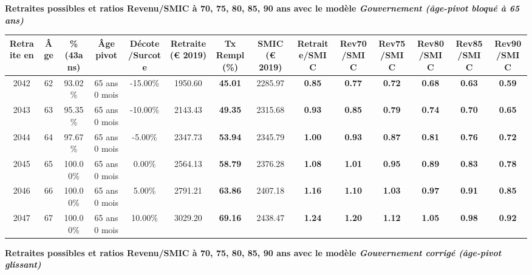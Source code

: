 {\bf \noindent Retraites possibles et ratios Revenu/SMIC à 70, 75, 80, 85, 90 ans avec le modèle \emph{Gouvernement (âge-pivot bloqué à 65 ans)}}  
 
\begin{adjustbox}{max width=\textwidth} 
\begin{tabular}[htb]{|c|c||c|c|c||c|c||c||c|c|c|c|c|c|} 
\hline 
 Retraite en &  Âge &  \%(43ans) &  Âge pivot &  Décote/Surcote &  Retraite (\euro{} 2019) &  Tx Rempl(\%) &  SMIC (\euro{} 2019) &  Retraite/SMIC &  Rev70/SMIC &  Rev75/SMIC &  Rev80/SMIC &  Rev85/SMIC &  Rev90/SMIC \\ 
\hline \hline 
 2042 &  62 &  93.02\% &  65 ans 0 mois &  -15.00\% &  1950.60 &  {\bf 45.01} &  2285.97 &  {\bf {\color{red} 0.85}} &  {\bf {\color{red} 0.77}} &  {\bf {\color{red} 0.72}} &  {\bf {\color{red} 0.68}} &  {\bf {\color{red} 0.63}} &  {\bf {\color{red} 0.59}} \\ 
\hline 
 2043 &  63 &  95.35\% &  65 ans 0 mois &  -10.00\% &  2143.43 &  {\bf 49.35} &  2315.68 &  {\bf {\color{red} 0.93}} &  {\bf {\color{red} 0.85}} &  {\bf {\color{red} 0.79}} &  {\bf {\color{red} 0.74}} &  {\bf {\color{red} 0.70}} &  {\bf {\color{red} 0.65}} \\ 
\hline 
 2044 &  64 &  97.67\% &  65 ans 0 mois &  -5.00\% &  2347.73 &  {\bf 53.94} &  2345.79 &  {\bf 1.00} &  {\bf {\color{red} 0.93}} &  {\bf {\color{red} 0.87}} &  {\bf {\color{red} 0.81}} &  {\bf {\color{red} 0.76}} &  {\bf {\color{red} 0.72}} \\ 
\hline 
 2045 &  65 &  100.00\% &  65 ans 0 mois &  0.00\% &  2564.13 &  {\bf 58.79} &  2376.28 &  {\bf 1.08} &  {\bf 1.01} &  {\bf {\color{red} 0.95}} &  {\bf {\color{red} 0.89}} &  {\bf {\color{red} 0.83}} &  {\bf {\color{red} 0.78}} \\ 
\hline 
 2046 &  66 &  100.00\% &  65 ans 0 mois &  5.00\% &  2791.21 &  {\bf 63.86} &  2407.18 &  {\bf 1.16} &  {\bf 1.10} &  {\bf 1.03} &  {\bf {\color{red} 0.97}} &  {\bf {\color{red} 0.91}} &  {\bf {\color{red} 0.85}} \\ 
\hline 
 2047 &  67 &  100.00\% &  65 ans 0 mois &  10.00\% &  3029.20 &  {\bf 69.16} &  2438.47 &  {\bf 1.24} &  {\bf 1.20} &  {\bf 1.12} &  {\bf 1.05} &  {\bf {\color{red} 0.98}} &  {\bf {\color{red} 0.92}} \\ 
\hline 
\hline 
\end{tabular} 
\end{adjustbox} 
 
 \vspace{0.1cm} 
{\bf \noindent Retraites possibles et ratios Revenu/SMIC à 70, 75, 80, 85, 90 ans avec le modèle \emph{Gouvernement corrigé (âge-pivot glissant)}}  
 
